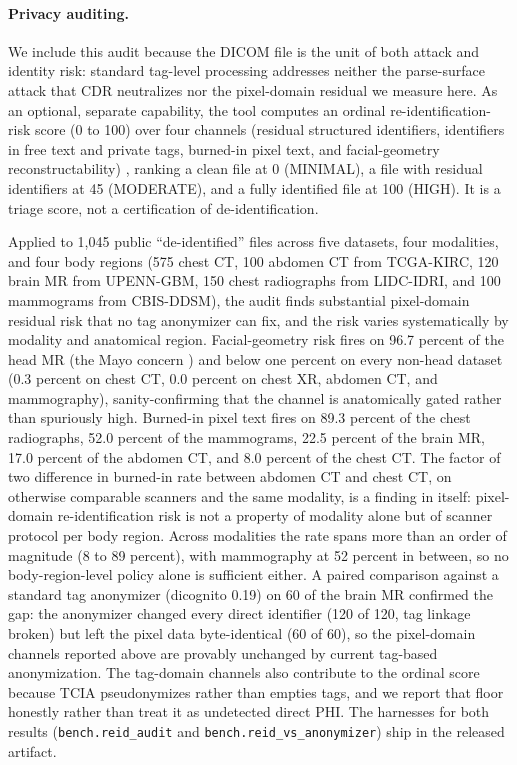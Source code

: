 \documentclass[11pt]{article}
\begin{document}
\paragraph{Privacy auditing.} We include this audit because the DICOM file is the unit of both attack and identity risk: standard tag-level processing addresses neither the parse-surface attack that CDR neutralizes nor the pixel-domain residual we measure here. As an optional, separate capability, the tool computes an ordinal re-identification-risk score (0 to 100) over four channels (residual structured identifiers, identifiers in free text and private tags, burned-in pixel text, and facial-geometry reconstructability) \cite{ref18,ref19}, ranking a clean file at 0 (MINIMAL), a file with residual identifiers at 45 (MODERATE), and a fully identified file at 100 (HIGH). It is a triage score, not a certification of de-identification.

Applied to 1,045 public ``de-identified'' files across five datasets, four modalities, and four body regions (575 chest CT, 100 abdomen CT from TCGA-KIRC, 120 brain MR from UPENN-GBM, 150 chest radiographs from LIDC-IDRI, and 100 mammograms from CBIS-DDSM), the audit finds substantial pixel-domain residual risk that no tag anonymizer can fix, and the risk varies systematically by modality and anatomical region. Facial-geometry risk fires on 96.7 percent of the head MR (the Mayo concern \cite{ref18,ref19}) and below one percent on every non-head dataset (0.3 percent on chest CT, 0.0 percent on chest XR, abdomen CT, and mammography), sanity-confirming that the channel is anatomically gated rather than spuriously high. Burned-in pixel text fires on 89.3 percent of the chest radiographs, 52.0 percent of the mammograms, 22.5 percent of the brain MR, 17.0 percent of the abdomen CT, and 8.0 percent of the chest CT. The factor of two difference in burned-in rate between abdomen CT and chest CT, on otherwise comparable scanners and the same modality, is a finding in itself: pixel-domain re-identification risk is not a property of modality alone but of scanner protocol per body region. Across modalities the rate spans more than an order of magnitude (8 to 89 percent), with mammography at 52 percent in between, so no body-region-level policy alone is sufficient either. A paired comparison against a standard tag anonymizer (dicognito 0.19) on 60 of the brain MR confirmed the gap: the anonymizer changed every direct identifier (120 of 120, tag linkage broken) but left the pixel data byte-identical (60 of 60), so the pixel-domain channels reported above are provably unchanged by current tag-based anonymization. The tag-domain channels also contribute to the ordinal score because TCIA pseudonymizes rather than empties tags, and we report that floor honestly rather than treat it as undetected direct PHI. The harnesses for both results (\verb|bench.reid_audit| and \verb|bench.reid_vs_anonymizer|) ship in the released artifact.
\end{document}
